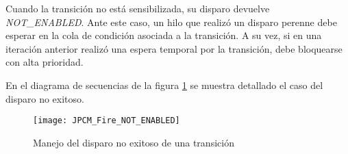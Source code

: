 Cuando la transición no está sensibilizada, su disparo devuelve
\textit{NOT\_ENABLED}. Ante este caso, un hilo que realizó un disparo perenne
debe esperar en la cola de condición asociada a la transición. A su vez, si en
una iteración anterior realizó una espera temporal por la transición, debe
bloquearse con alta prioridad.
 
En el diagrama de secuencias de la figura \ref{fig:JPCM_Fire_NOT_ENABLED} se muestra
detallado el caso del disparo no exitoso.

\begin{figure}[H]
  \hspace*{-2cm}
  \texttt{[image: JPCM\_Fire\_NOT\_ENABLED]}
  \caption{Manejo del disparo no exitoso de una transición}
  \label{fig:JPCM_Fire_NOT_ENABLED}
\end{figure}

